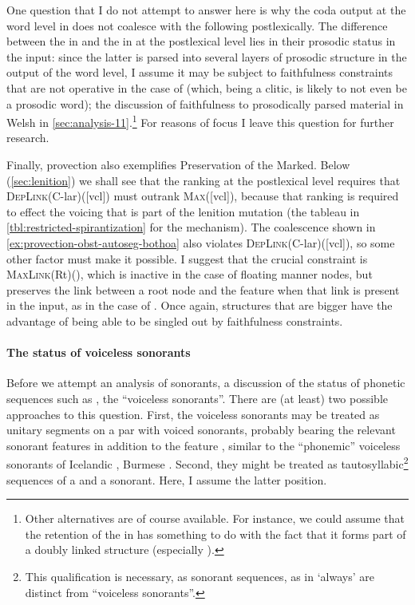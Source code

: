 One question that I do not attempt to answer here is why the coda \ipa{[h]} output at the word level in \ipa{[ˈzɛhtər]} does not coalesce with the following \ipa{[t]} postlexically. The difference between the \ipa{[h]} in \ipa{[oh]} and the \ipa{[h]} in \ipa{[ˈzɛhtər]} at the postlexical level lies in their prosodic status in the input: since the latter is parsed into several layers of prosodic structure in the output of the word level, I assume it may be subject to faithfulness constraints that are not operative in the case of \ipa{[oh]} (which, being a clitic, is likely to not even be a prosodic word); \cf the discussion of faithfulness to prosodically parsed material in Welsh in \cref{sec:analysis-11}.\footnote{Other alternatives are of course available. For instance, we could assume that the retention of the \ipa{[h]} in \ipa{[ˈzɛhtər]} has something to do with the fact that it forms part of a doubly linked structure (\cf especially \citealt{hayes86:_inalt_cv,kirchnergem,honeybone05:_sharin_makes_us_stron}).} For reasons of focus I leave this question for further research.

Finally, provection also exemplifies Preservation of the Marked. Below (\cref{sec:lenition}) we shall see that the ranking at the postlexical level requires that \textsc{DepLink}(C-lar)([vcl]) must outrank \textsc{Max}([vcl]), because that ranking is required to effect the voicing that is part of the lenition mutation (\cf the tableau in \ref{tbl:restricted-spirantization} for the mechanism). The coalescence shown in \ref{ex:provection-obst-autoseg-bothoa} also violates \textsc{DepLink}(C-lar)([vcl]), so some other factor must make it possible. I suggest that the crucial constraint is \textsc{MaxLink}(Rt)(), which is inactive in the case of floating manner nodes, but preserves the link between a root node and the  feature when that link is present in the input, as in the case of \ipa{[h]}. Once again, structures that are bigger have the advantage of being able to be singled out by faithfulness constraints.

\paragraph{The status of voiceless sonorants}
\label{sec:provection-sonorants}

Before we attempt an analysis of sonorants, a discussion of the status of phonetic sequences such as , \ie the \enquote{voiceless sonorants}. There are (at least) two possible approaches to this question. First, the voiceless sonorants may be treated as unitary segments on a par with voiced sonorants, probably bearing the relevant sonorant features in addition to the feature , similar to the \enquote{phonemic} voiceless sonorants of Icelandic \citep[\egm][§6.4]{arnason11:_icelan_faroes}, Burmese \citep{maddieson84:_is}. Second, they might be treated as tautosyllabic\footnote{This qualification is necessary, as \ipa{[h]}\endash sonorant sequences, as in \ipa{[dæhˈmaːd̥]} `always' are distinct from \enquote{voiceless sonorants}.} sequences of a \ipa{[h]} and a sonorant. Here, I assume the latter position.

